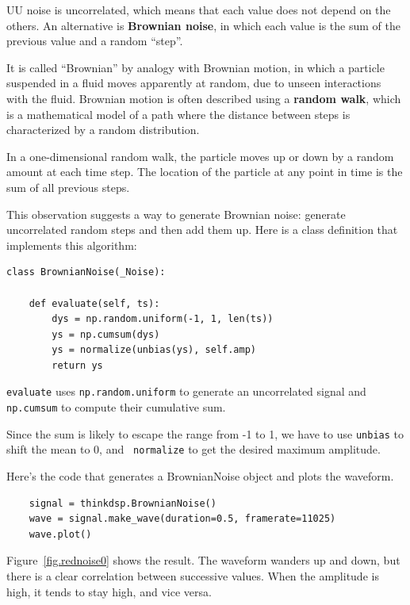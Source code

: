 \documentclass[12pt]{book}
\begin{document}
UU noise is uncorrelated, which means that each value does not depend
on the others.  An alternative is {\bf Brownian noise}, in which each value
is the sum of the previous value and a random ``step''.

It is called ``Brownian'' by analogy with Brownian motion, in which a
particle suspended in a fluid moves apparently at random, due to
unseen interactions with the fluid.  Brownian motion is often
described using a {\bf random walk}, which is a mathematical model
of a path where the distance between steps is characterized by a
random distribution.

In a one-dimensional random walk, the particle moves up or down
by a random amount at each time step.  The location of the particle
at any point in time is the sum of all previous steps.

This observation suggests a way to generate Brownian noise:
generate uncorrelated random steps and then add them up.
Here is a class definition that implements this algorithm:

\begin{verbatim}
class BrownianNoise(_Noise):

    def evaluate(self, ts):
        dys = np.random.uniform(-1, 1, len(ts))
        ys = np.cumsum(dys)
        ys = normalize(unbias(ys), self.amp)
        return ys
\end{verbatim}

{\tt evaluate} uses {\tt np.random.uniform} to generate an
uncorrelated signal and {\tt np.cumsum} to compute their cumulative
sum.

Since the sum is likely to escape the range from -1 to
1, we have to use {\tt unbias} to shift the mean to 0, and {\tt
  normalize} to get the desired maximum amplitude.

Here's the code that generates a BrownianNoise object and plots the
waveform.

\begin{verbatim}
    signal = thinkdsp.BrownianNoise()
    wave = signal.make_wave(duration=0.5, framerate=11025)
    wave.plot()
\end{verbatim}

Figure~\ref{fig.rednoise0} shows the result.  The waveform
wanders up and down, but there is a clear correlation between
successive values.  When the amplitude is high, it tends to stay
high, and vice versa.
\end{document}
